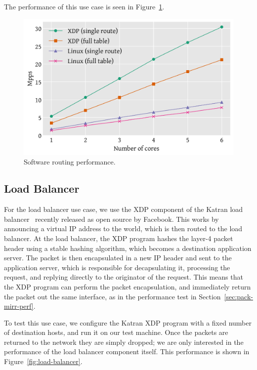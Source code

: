 \documentclass[10pt,sigconf]{acmart}
\begin{document}
The performance of this use case is seen in Figure~\ref{fig:router-fwd}.

\begin{figure}[t]
\centering
\includegraphics[width=\linewidth]{figures/router-fwd.pdf}
\caption{\label{fig:router-fwd} Software routing performance.}
\end{figure}


\subsection{Load Balancer}
\label{sec:load-balancer}
For the load balancer use case, we use the XDP component of the Katran load
balancer~\cite{katran} recently released as open source by Facebook. This works
by announcing a virtual IP address to the world, which is then routed to the
load balancer. At the load balancer, the XDP program hashes the layer-4 packet
header using a stable hashing algorithm, which becomes a destination application
server. The packet is then encapsulated in a new IP header and sent to the
application server, which is responsible for decapsulating it, processing the
request, and replying directly to the originator of the request. This means that
the XDP program can perform the packet encapsulation, and immediately return the
packet out the same interface, as in the performance test in
Section~\ref{sec:pack-mirr-perf}.

To test this use case, we configure the Katran XDP program with a fixed number
of destination hosts, and run it on our test machine. Once the packets are
returned to the network they are simply dropped; we are only interested in the
performance of the load balancer component itself. This performance is shown in
Figure~\ref{fig:load-balancer}.
\end{document}
